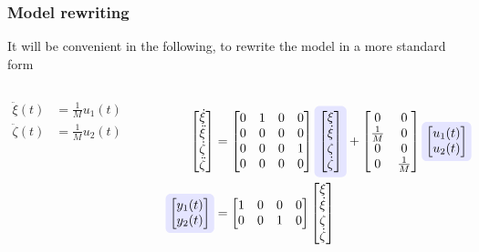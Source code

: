 \begin{frame} 
    \frametitle{Model rewriting}
    It will be convenient in the following, to rewrite the model in a more standard form
    \begin{columns}[onlytextwidth]
        \begin{align*}
        \ddot{\xi}(t)& = \frac{1}{M} u_1(t) \\
        \ddot{\zeta}(t)& = \frac{1}{M} u_2(t)
        \end{align*}
        \vspace*{2em}
        \begin{center}
        \end{center}
        \vspace*{1em}
        \begin{align*}
        \mat{\dot{\xi}\\\ddot{\xi}\\\dot{\zeta}\\\ddot{\zeta}} 
        &=
        \mat{0&1&0&0\\0&0&0&0\\0&0&0&1\\0&0&0&0}
        \tikz[baseline]{
            \node[fill=blue!10,anchor=base,rounded corners] (state)
            {$\mat{{\xi}\\\dot{\xi}\\{\zeta}\\\dot{\zeta}}$};
        }
        + 
        \mat{0&0\\ \frac{1}{M} &0\\0&0 \\0&\frac{1}{M}} 
        \tikz[baseline]{
            \node[fill=blue!10,anchor=base,rounded corners] (input)
            {$\mat{u_1(t)\\u_2(t)}$};
        }\\
        \tikz[baseline]{
            \node[fill=blue!10,anchor=base,rounded corners] (output)
            {$\mat{y_1(t)\\y_2(t)}$};
        }
        &=\mat{1&0&0&0\\0&0&1&0}\mat{\xi\\\dot{\xi}\\{\zeta}\\\dot{\zeta}}
        \end{align*}
        

\end{columns}
\end{frame}
